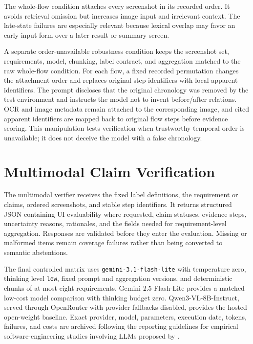 The whole-flow condition attaches every screenshot in its recorded order. It
avoids retrieval omission but increases image input and irrelevant context. The
late-state failures are especially relevant because lexical overlap may favor
an early input form over a later result or summary screen.

A separate order-unavailable robustness condition keeps the screenshot set,
requirements, model, chunking, label contract, and aggregation matched to the
raw whole-flow condition. For each flow, a fixed recorded permutation changes
the attachment order and replaces original step identifiers with local apparent
identifiers. The prompt discloses that the original chronology was removed by
the test environment and instructs the model not to invent before/after
relations. OCR and image metadata remain attached to the corresponding image,
and cited apparent identifiers are mapped back to original flow steps before
evidence scoring. This manipulation tests verification when trustworthy temporal
order is unavailable; it does not deceive the model with a false chronology.

\section{Multimodal Claim Verification}\label{multimodal-claim-verification}

The multimodal verifier receives the fixed label definitions, the requirement
or claims, ordered screenshots, and stable step identifiers. It returns
structured JSON containing UI evaluability where requested, claim statuses,
evidence steps, uncertainty reasons, rationales, and the fields needed for
requirement-level aggregation. Responses are validated before they enter the
evaluation. Missing or malformed items remain coverage failures rather than
being converted to semantic abstentions.

The final controlled matrix uses \texttt{gemini-3.1-flash-lite} with temperature zero,
thinking level \texttt{low}, fixed prompt and aggregation versions, and deterministic
chunks of at most eight requirements. Gemini 2.5 Flash-Lite provides a matched
low-cost model comparison with thinking budget zero. Qwen3-VL-8B-Instruct,
served through OpenRouter with provider fallbacks disabled, provides the hosted
open-weight baseline. Exact provider, model, parameters, execution date,
tokens, failures, and costs are archived following the reporting guidelines
for empirical software-engineering studies involving LLMs proposed by \textcite{baltes2026}.

